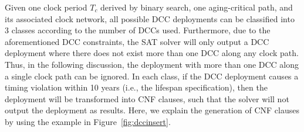 Given one clock period $T_c$ derived by binary search, one aging-critical path, and its associated clock network, all possible DCC deployments can be classified into 3 classes according to the number of DCCs used. Furthermore, due to the aforementioned DCC constraints, the SAT solver will only output a DCC deployment where there does not exist more than one DCC along any clock path. Thus, in the following discussion, the deployment with more than one DCC along a single clock path can be ignored. In each class, if the DCC deployment causes a timing violation within 10 years (i.e., the lifespan specification), then the deployment will be transformed into CNF clauses, such that the solver will not output the deployment as results. Here, we explain the generation of CNF clauses by using the example in Figure~\ref{fig:dccinsert}.

